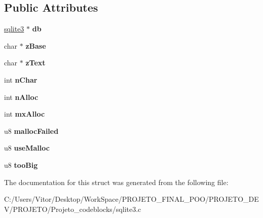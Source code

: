 \subsection*{Public Attributes}
\begin{DoxyCompactItemize}
\item 
\hypertarget{struct_str_accum_ade44091c9a91671c9457b9e4a98a9a5d}{\hyperlink{structsqlite3}{sqlite3} $\ast$ {\bfseries db}}\label{struct_str_accum_ade44091c9a91671c9457b9e4a98a9a5d}

\item 
\hypertarget{struct_str_accum_a5797e2f288573ee98a4025f0f96fe50d}{char $\ast$ {\bfseries z\-Base}}\label{struct_str_accum_a5797e2f288573ee98a4025f0f96fe50d}

\item 
\hypertarget{struct_str_accum_ac45a51cb7b85da2ae9865eac21d416dc}{char $\ast$ {\bfseries z\-Text}}\label{struct_str_accum_ac45a51cb7b85da2ae9865eac21d416dc}

\item 
\hypertarget{struct_str_accum_a88bf779588ca597a41fde3e41186e003}{int {\bfseries n\-Char}}\label{struct_str_accum_a88bf779588ca597a41fde3e41186e003}

\item 
\hypertarget{struct_str_accum_ae2f21c484b737b9903e695977c27815a}{int {\bfseries n\-Alloc}}\label{struct_str_accum_ae2f21c484b737b9903e695977c27815a}

\item 
\hypertarget{struct_str_accum_ab9985e4aabc65bebbf026881ce0b59bd}{int {\bfseries mx\-Alloc}}\label{struct_str_accum_ab9985e4aabc65bebbf026881ce0b59bd}

\item 
\hypertarget{struct_str_accum_a6bc89e5ed8495ddcddadf0940f236c84}{u8 {\bfseries malloc\-Failed}}\label{struct_str_accum_a6bc89e5ed8495ddcddadf0940f236c84}

\item 
\hypertarget{struct_str_accum_abc135ceee2e63f41c101aceca5e9417b}{u8 {\bfseries use\-Malloc}}\label{struct_str_accum_abc135ceee2e63f41c101aceca5e9417b}

\item 
\hypertarget{struct_str_accum_ae5b62e58c33302b44fedf0e204757ced}{u8 {\bfseries too\-Big}}\label{struct_str_accum_ae5b62e58c33302b44fedf0e204757ced}

\end{DoxyCompactItemize}


The documentation for this struct was generated from the following file\-:\begin{DoxyCompactItemize}
\item 
C\-:/\-Users/\-Vitor/\-Desktop/\-Work\-Space/\-P\-R\-O\-J\-E\-T\-O\-\_\-\-F\-I\-N\-A\-L\-\_\-\-P\-O\-O/\-P\-R\-O\-J\-E\-T\-O\-\_\-\-D\-E\-V/\-P\-R\-O\-J\-E\-T\-O/\-Projeto\-\_\-codeblocks/sqlite3.\-c\end{DoxyCompactItemize}
